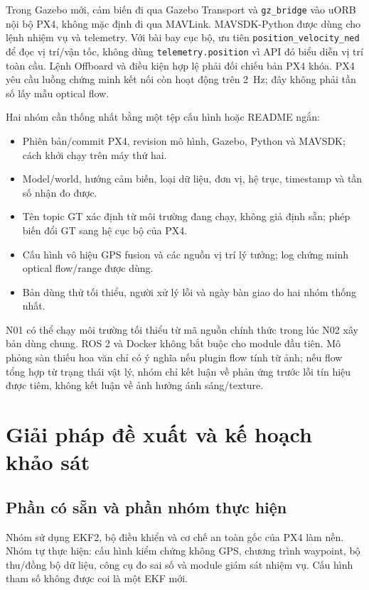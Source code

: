 \documentclass[a4paper,12pt]{article}
\newcommand{\code}[1]{\texttt{#1}}
\begin{document}
Trong Gazebo mới, cảm biến đi qua Gazebo Transport và \code{gz\_bridge} vào uORB nội bộ PX4, không mặc định đi qua MAVLink\cite{bridge}. MAVSDK-Python được dùng cho lệnh nhiệm vụ và telemetry. Với bài bay cục bộ, ưu tiên \code{position\_velocity\_ned} để đọc vị trí/vận tốc, không dùng \code{telemetry.position} vì API đó biểu diễn vị trí toàn cầu\cite{sdk}. Lệnh Offboard và điều kiện hợp lệ phải đối chiếu bản PX4 khóa. PX4 yêu cầu luồng chứng minh kết nối còn hoạt động trên 2~Hz; đây không phải tần số lấy mẫu optical flow\cite{offboard}.

Hai nhóm cần thống nhất bằng một tệp cấu hình hoặc README ngắn:
\begin{itemize}
\item Phiên bản/commit PX4, revision mô hình, Gazebo, Python và MAVSDK; cách khởi chạy trên máy thứ hai.
\item Model/world, hướng cảm biến, loại dữ liệu, đơn vị, hệ trục, timestamp và tần số nhận đo được.
\item Tên topic GT xác định từ môi trường đang chạy, không giả định sẵn; phép biến đổi GT sang hệ cục bộ của PX4.
\item Cấu hình vô hiệu GPS fusion và các nguồn vị trí lý tưởng; log chứng minh optical flow/range được dùng.
\item Bản dùng thử tối thiểu, người xử lý lỗi và ngày bàn giao do hai nhóm thống nhất.
\end{itemize}

N01 có thể chạy môi trường tối thiểu từ mã nguồn chính thức trong lúc N02 xây bản dùng chung. ROS 2 và Docker không bắt buộc cho module đầu tiên. Mô phỏng sàn thiếu hoa văn chỉ có ý nghĩa nếu plugin flow tính từ ảnh; nếu flow tổng hợp từ trạng thái vật lý, nhóm chỉ kết luận về phản ứng trước lỗi tín hiệu được tiêm, không kết luận về ảnh hưởng ánh sáng/texture.

\section{Giải pháp đề xuất và kế hoạch khảo sát}
\subsection{Phần có sẵn và phần nhóm thực hiện}
Nhóm sử dụng EKF2, bộ điều khiển và cơ chế an toàn gốc của PX4 làm nền. Nhóm tự thực hiện: cấu hình kiểm chứng không GPS, chương trình waypoint, bộ thu/đồng bộ dữ liệu, công cụ đo sai số và module giám sát nhiệm vụ. Cấu hình tham số không được coi là một EKF mới.
\end{document}
